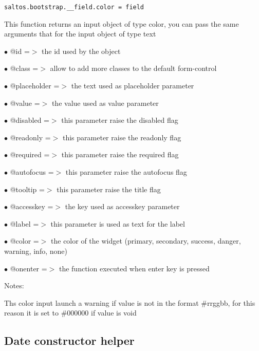 \documentclass[a4paper]{book}
\begin{document}
\begin{lstlisting}
saltos.bootstrap.__field.color = field
\end{lstlisting}

This function returns an input object of type color, you can pass the same
arguments that for the input object of type text

\begin{compactitem}
\item[\color{myblue}$\bullet$] @id          =$>$ the id used by the object
\item[\color{myblue}$\bullet$] @class       =$>$ allow to add more classes to the default form-control
\item[\color{myblue}$\bullet$] @placeholder =$>$ the text used as placeholder parameter
\item[\color{myblue}$\bullet$] @value       =$>$ the value used as value parameter
\item[\color{myblue}$\bullet$] @disabled    =$>$ this parameter raise the disabled flag
\item[\color{myblue}$\bullet$] @readonly    =$>$ this parameter raise the readonly flag
\item[\color{myblue}$\bullet$] @required    =$>$ this parameter raise the required flag
\item[\color{myblue}$\bullet$] @autofocus   =$>$ this parameter raise the autofocus flag
\item[\color{myblue}$\bullet$] @tooltip     =$>$ this parameter raise the title flag
\item[\color{myblue}$\bullet$] @accesskey   =$>$ the key used as accesskey parameter
\item[\color{myblue}$\bullet$] @label       =$>$ this parameter is used as text for the label
\item[\color{myblue}$\bullet$] @color       =$>$ the color of the widget (primary, secondary, success, danger, warning, info, none)
\item[\color{myblue}$\bullet$] @onenter     =$>$ the function executed when enter key is pressed
\end{compactitem}

Notes:

Ths color input launch a warning if value is not in the format \#rrggbb,
for this reason it is set to \#000000 if value is void

\hypertarget{toc465}{}
\subsection{Date constructor helper}
\end{document}
